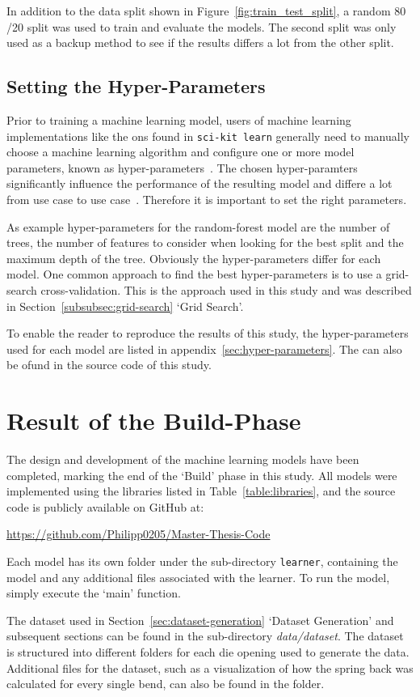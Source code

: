 In addition to the data split shown in Figure~\ref{fig:train_test_split}, a random 80
/20 split was used to train and evaluate the models.
The second split was only used as a backup method to see if the results differs a lot from the other split.

\subsection{Setting the Hyper-Parameters}\label{subsec:hyper-parameters}
Prior to training a machine learning model, users of machine learning implementations like the ons found in
\texttt{sci-kit learn} generally need to manually choose a machine learning algorithm and configure one or more model
parameters, known as hyper-parameters~\cite[pp. 1]{claesen2015hyperparameter}.
The chosen hyper-paramters significantly influence the performance of the resulting model and differe a lot from use
case to use case~\cite[pp. 1]{claesen2015hyperparameter}.
Therefore it is important to set the right parameters.

As example hyper-parameters for the random-forest model are the number of trees, the number of features to consider when
looking for the best split and the maximum depth of the tree.
Obviously the hyper-parameters differ for each model.
One common approach to find the best hyper-parameters is to use a grid-search cross-validation.
This is the approach used in this study and was described in Section~\ref{subsubsec:grid-search} `Grid Search'.

To enable the reader to reproduce the results of this study, the hyper-parameters used for each model are listed in
appendix~\ref{sec:hyper-parameters}.
The can also be ofund in the source code of this study.


\section{Result of the Build-Phase}\label{sec:results-build-phase}

The design and development of the machine learning models have been completed, marking the end of the `Build' phase
in this study.
All models were implemented using the libraries listed in Table~\ref{table:libraries}, and the source
code is publicly available on GitHub at:

\url{https://github.com/Philipp0205/Master-Thesis-Code}

Each model has its own folder under the sub-directory \texttt{learner}, containing the model and any additional files
associated with the learner. To run the model, simply execute the `main' function.

The dataset used in Section~\ref{sec:dataset-generation} `Dataset Generation' and subsequent sections can be found in
the sub-directory \textit{data/dataset}. The dataset is structured into different folders for each die opening used
to generate the data. Additional files for the dataset, such as a visualization of how the spring back was calculated
for every single bend, can also be found in the folder.